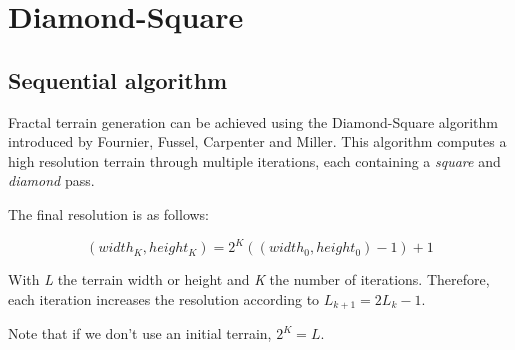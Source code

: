 \section{Diamond-Square}
\subsection{Sequential algorithm}
Fractal terrain generation can be achieved using the Diamond-Square algorithm introduced by Fournier, Fussel, Carpenter\cite{fournier1982computer} and Miller\cite{miller1986definition}. This algorithm computes a high resolution terrain through multiple iterations, each containing a \textit{square} and \textit{diamond} pass.

The final resolution is as follows:

\begin{equation}
(width_K, height_K) = 2^{K} ((width_0, height_0) - 1) + 1
\end{equation}

With \textit{L} the terrain width or height and \textit{K} the number of iterations. Therefore, each iteration increases the resolution according to $L_{k+1} = 2 L_k - 1$.

Note that if we don't use an initial terrain, $2^K = L$.

